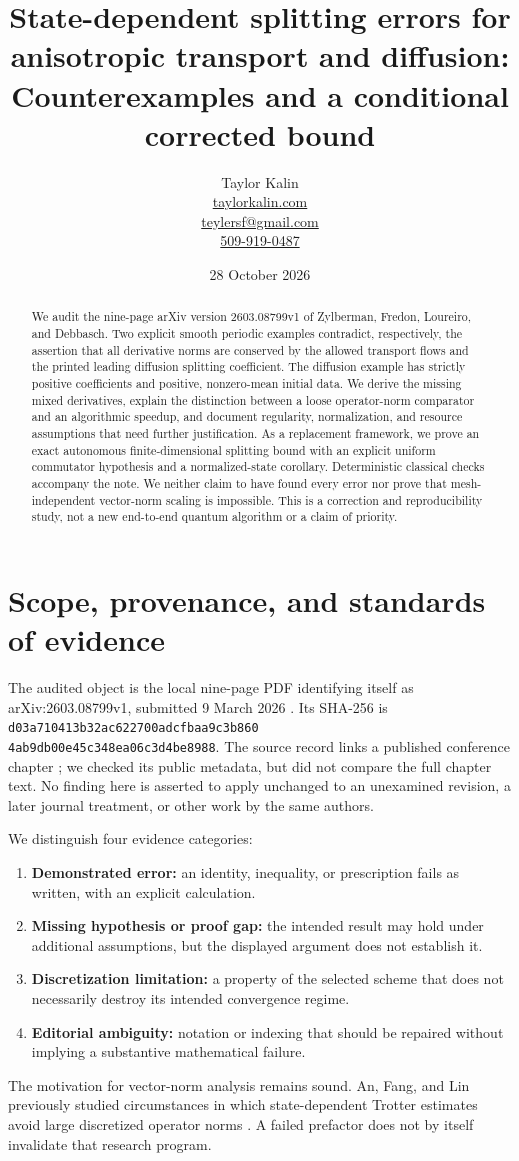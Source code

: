 \documentclass[11pt]{article}
\title{State-dependent splitting errors for anisotropic transport and diffusion:\\Counterexamples and a conditional corrected bound}
\author{Taylor Kalin\\
\small\href{https://taylorkalin.com}{taylorkalin.com}\\
\small\href{mailto:teylersf@gmail.com}{teylersf@gmail.com}\\
\small\href{tel:+15099190487}{509-919-0487}}
\date{28 October 2026}
\begin{document}
\maketitle
\begin{abstract}
We audit the nine-page arXiv version 2603.08799v1 of Zylberman, Fredon,
Loureiro, and Debbasch. Two explicit smooth periodic examples contradict,
respectively, the assertion that all derivative norms are conserved by the
allowed transport flows and the printed leading diffusion splitting
coefficient. The diffusion example has strictly positive coefficients and
positive, nonzero-mean initial data. We derive the missing mixed derivatives,
explain the distinction between a loose operator-norm comparator and an
algorithmic speedup, and document regularity, normalization, and resource
assumptions that need further justification. As a replacement framework,
we prove an exact autonomous finite-dimensional splitting bound with an
explicit uniform commutator hypothesis and a normalized-state corollary.
Deterministic classical checks accompany the note. We neither claim to have
found every error nor prove that mesh-independent vector-norm scaling is
impossible. This is a correction and reproducibility study, not a new
end-to-end quantum algorithm or a claim of priority.
\end{abstract}

\section{Scope, provenance, and standards of evidence}
The audited object is the local nine-page PDF identifying itself as
arXiv:2603.08799v1, submitted 9 March 2026 \cite{original}. Its SHA-256 is
\texttt{d03a710413b32ac622700adcfbaa9c3b860}\\
\texttt{4ab9db00e45c348ea06c3d4be8988}.
The source record links a published conference chapter \cite{chapter};
we checked its public metadata, but did not compare the full chapter text.
No finding here is asserted to apply unchanged to an unexamined revision,
a later journal treatment, or other work by the same authors.

We distinguish four evidence categories:
\begin{enumerate}
\item \textbf{Demonstrated error:} an identity, inequality, or prescription
fails as written, with an explicit calculation.
\item \textbf{Missing hypothesis or proof gap:} the intended result may hold
under additional assumptions, but the displayed argument does not establish it.
\item \textbf{Discretization limitation:} a property of the selected scheme
that does not necessarily destroy its intended convergence regime.
\item \textbf{Editorial ambiguity:} notation or indexing that should be repaired
without implying a substantive mathematical failure.
\end{enumerate}
The motivation for vector-norm analysis remains sound. An, Fang, and Lin
previously studied circumstances in which state-dependent Trotter estimates
avoid large discretized operator norms \cite{an}. A failed prefactor does not
by itself invalidate that research program.
\end{document}
